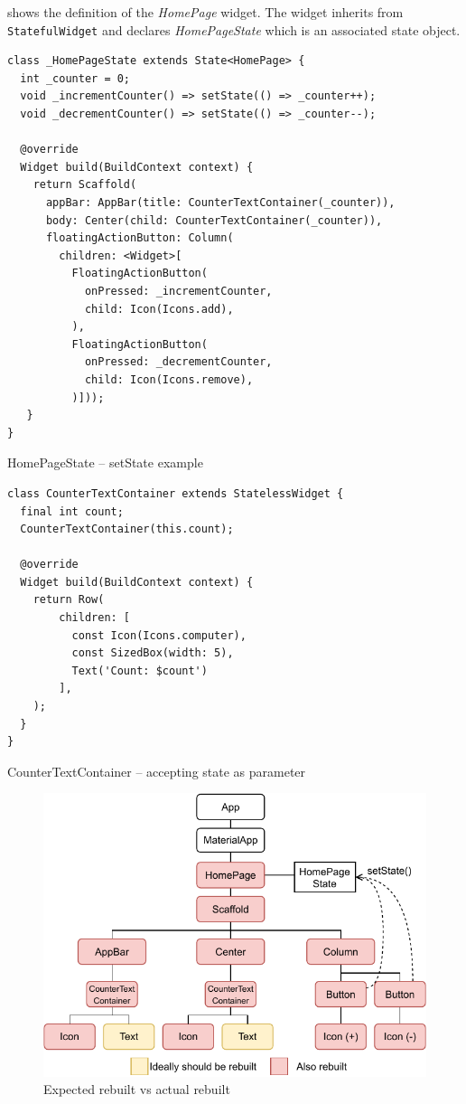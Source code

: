  shows the definition of the \textit{HomePage} widget. The widget inherits from \verb|StatefulWidget| and declares \textit{HomePageState} which is an associated state object.

\begin{listing}[ht]
\begin{verbatim}
class _HomePageState extends State<HomePage> {
  int _counter = 0;
  void _incrementCounter() => setState(() => _counter++);
  void _decrementCounter() => setState(() => _counter--);

  @override
  Widget build(BuildContext context) {
    return Scaffold(
      appBar: AppBar(title: CounterTextContainer(_counter)),
      body: Center(child: CounterTextContainer(_counter)),
      floatingActionButton: Column(
        children: <Widget>[
          FloatingActionButton(
            onPressed: _incrementCounter,
            child: Icon(Icons.add),
          ),
          FloatingActionButton(
            onPressed: _decrementCounter,
            child: Icon(Icons.remove),
          )]));
   }
}
\end{verbatim}
\caption{HomePageState -- setState example}
\label{listing:counter-base-state-homepage}
\end{listing}

\begin{listing}[ht]
\begin{verbatim}
class CounterTextContainer extends StatelessWidget {
  final int count;
  CounterTextContainer(this.count);
  
  @override
  Widget build(BuildContext context) {
    return Row(
        children: [
          const Icon(Icons.computer),
          const SizedBox(width: 5),
          Text('Count: $count')
        ],
    );
  }
}
\end{verbatim}
\caption{CounterTextContainer -- accepting state as parameter}
\label{listing:counter-base-text-container}
\end{listing}

\begin{figure}[htp]
    \centering
    \includegraphics[width=0.75\linewidth]{img/flutter/counter-base-setState.pdf}
    \caption{Expected rebuilt vs actual rebuilt}
    \label{fig:counter-app-base-build}
\end{figure}

